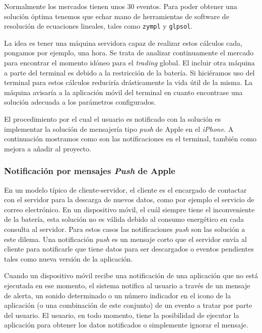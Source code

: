  Normalmente los mercados tienen unos 30 eventos. Para poder obtener una solución óptima tenemos que echar mano de herramientas de software de resolución de ecuaciones lineales, tales como \lstinline{zympl} y \lstinline{glpsol}. 
  
  
  
   La idea es tener una máquina servidora capaz de realizar estos cálculos cada, pongamos por ejemplo, una hora. Se trata de analizar continuamente el mercado para encontrar el momento idóneo para el \emph{trading} global. El incluir otra máquina a parte del terminal es debido a la restricción de la batería. Si hiciéramos uso del terminal para estos cálculos reduciría drásticamente la vida útil de la misma. La máquina avisaría a la aplicación móvil del terminal en cuanto encontrase una solución adecuada a los parámetros configurados. 
   
    El procedimiento por el cual el usuario es notificado con la solución es implementar la solución de mensajería tipo \emph{push} de Apple en el \emph{iPhone}. A continuación mostramos como son las notificaciones en el terminal, también como mejora a añadir al proyecto.
    
 \subsubsection*{Notificación por mensajes \emph{Push} de Apple}
   
   En un modelo típico de cliente-servidor, el cliente es el encargado de contactar con el servidor para la descarga de nuevos datos, como por ejemplo el servicio de correo electrónico. En un dispositivo móvil, el cuál siempre tiene el inconveniente de la batería, esta solución no es válida debido al consumo energético en cada consulta al servidor. Para estos casos las notificaciones \emph{push} son las solución a este dilema. Una notificación \emph{push} es un mensaje corto que el servidor envía al cliente para notificarle que tiene datos para ser descargados o eventos pendientes tales como nueva versión de la aplicación. 
   
    Cuando un dispositivo móvil recibe una notificación de una aplicación que no está ejecutada en ese momento, el sistema notifica al usuario a través de un mensaje de alerta, un sonido determinado o un número indicador en el icono de la aplicación (o una combinación de este conjunto) de un evento a tratar por parte del usuario. El usuario, en todo momento, tiene la posibilidad de ejecutar la aplicación para obtener los datos notificados o simplemente ignorar el mensaje.

